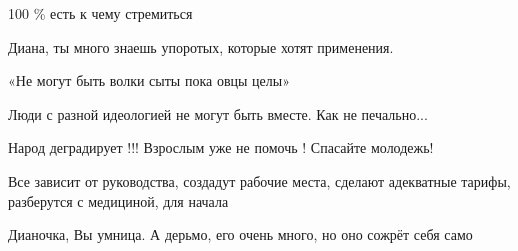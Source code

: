 \begin{itemize}
100 \% есть к чему стремиться

 
Диана, ты много знаешь упоротых, которые хотят применения.

 
«Не могут быть волки сыты пока овцы целы»

 
Люди с разной идеологией не могут быть вместе. Как не печально...

 
Народ деградирует !!! Взрослым уже не помочь ! Спасайте молодежь!

 
Все зависит от руководства, создадут рабочие места, сделают адекватные тарифы, разберутся с медициной, для начала

 
Дианочка, Вы умница. А дерьмо, его очень много, но оно сожрёт себя само

 


\end{itemize}

